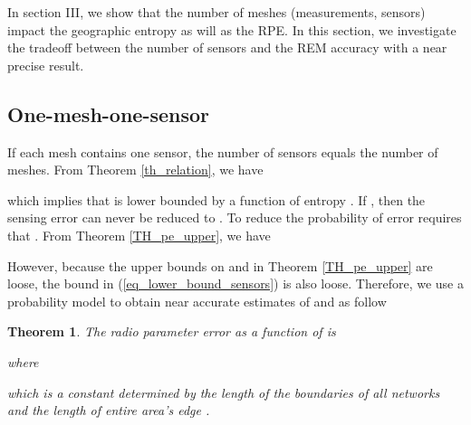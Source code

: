 \documentclass[conference]{IEEEtran}
\newtheorem{Theo}{Theorem}
\begin{document}
In section III, we show that the number of meshes (measurements, sensors) impact the geographic entropy as will as the RPE. In this section, we investigate the tradeoff between the number of sensors and the REM accuracy with a near precise result.

\begin{figure*}[ht]
\normalsize




\hrulefill \vspace*{4pt}
\end{figure*}

\subsection{One-mesh-one-sensor}
If each mesh contains one sensor, the number of sensors equals the number of meshes.
From Theorem \ref{th_relation}, we have

which implies that  is lower bounded by a function of entropy .
If , then the sensing error can never be reduced to .
To reduce the probability of error requires that .
From Theorem \ref{TH_pe_upper}, we have

However, because the upper bounds on  and  in Theorem \ref{TH_pe_upper} are loose,
the bound in (\ref{eq_lower_bound_sensors}) is also loose.
Therefore, we use a probability model to obtain near accurate estimates of  and  as follow

\begin{Theo}
The radio parameter error as a function of  is

where

which is a constant determined by the length of the boundaries of all networks  and the length of entire area's edge .
\end{Theo}
\end{document}
